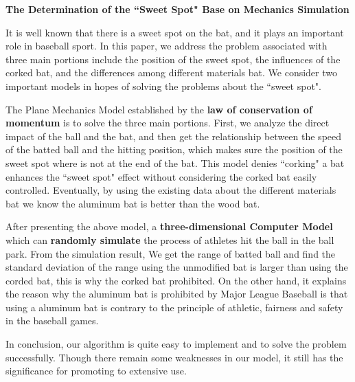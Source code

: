 \documentclass[a4paper]{article}
\begin{document}
\begin{center}
\textbf{The Determination of the ``Sweet Spot" Base on Mechanics Simulation}
\end{center}
\setlength{\parindent}{0pt} \setlength{\parskip}{1.5ex plus 0.5ex
minus 0.2ex}
It is well known that there is a sweet spot on the bat, and it plays
an important role in baseball sport. In this paper, we address the
problem associated with three main portions include the position of
the sweet spot, the influences of the corked bat, and the
differences among different materials bat. We consider two important
models in hopes of solving the problems about the ``sweet spot".

The Plane Mechanics Model established by the \textbf{law of
conservation of momentum} is to solve the three main portions.
First, we analyze the direct impact of the ball and the bat, and
then get the relationship between the speed of the batted ball and
the hitting position, which makes sure the position of the sweet
spot where is not at the end of the bat. This model denies
``corking" a bat enhances the ``sweet spot" effect without
considering the corked bat easily controlled. Eventually, by using
the existing data about the different materials bat we know the
aluminum bat is better than the wood bat.

After presenting the above model, a \textbf{three-dimensional
Computer Model} which can \textbf{randomly simulate} the process of
athletes hit the ball in the ball park. From the simulation result,
We get the range of batted ball and find the standard deviation of
the range using the unmodified bat is larger than using the corded
bat, this is why the corked bat prohibited. On the other hand, it
explains the reason why the aluminum bat is prohibited by Major
League Baseball is that using a aluminum bat is contrary to the
principle of athletic, fairness and safety in the baseball games.

In conclusion, our algorithm is quite easy to implement and to solve
the problem successfully. Though there remain some weaknesses in our
model, it still has the significance for promoting to extensive use.
\end{document}

